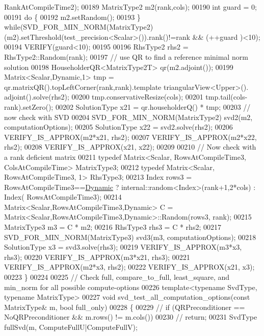 \begin{DoxyCode}
      RankAtCompileTime2);
00189   MatrixType2 m2(rank,cols);
00190   \textcolor{keywordtype}{int} guard = 0;
00191   \textcolor{keywordflow}{do} \{
00192     m2.setRandom();
00193   \} \textcolor{keywordflow}{while}(SVD\_FOR\_MIN\_NORM(MatrixType2)(m2).setThreshold(test\_precision<Scalar>()).rank()!=rank && (++guard
      )<10);
00194   VERIFY(guard<10);
00195 
00196   RhsType2 rhs2 = RhsType2::Random(rank);
00197   \textcolor{comment}{// use QR to find a reference minimal norm solution}
00198   HouseholderQR<MatrixType2T> qr(m2.adjoint());
00199   Matrix<Scalar,Dynamic,1> tmp = qr.matrixQR().topLeftCorner(rank,rank).template triangularView<Upper>().
      adjoint().solve(rhs2);
00200   tmp.conservativeResize(cols);
00201   tmp.tail(cols-rank).setZero();
00202   SolutionType x21 = qr.householderQ() * tmp;
00203   \textcolor{comment}{// now check with SVD}
00204   SVD\_FOR\_MIN\_NORM(MatrixType2) svd2(m2, computationOptions);
00205   SolutionType x22 = svd2.solve(rhs2);
00206   VERIFY\_IS\_APPROX(m2*x21, rhs2);
00207   VERIFY\_IS\_APPROX(m2*x22, rhs2);
00208   VERIFY\_IS\_APPROX(x21, x22);
00209 
00210   \textcolor{comment}{// Now check with a rank deficient matrix}
00211   \textcolor{keyword}{typedef} Matrix<Scalar, RowsAtCompileTime3, ColsAtCompileTime> MatrixType3;
00212   \textcolor{keyword}{typedef} Matrix<Scalar, RowsAtCompileTime3, 1> RhsType3;
00213   Index rows3 = RowsAtCompileTime3==\hyperlink{namespace_eigen_ad81fa7195215a0ce30017dfac309f0b2}{Dynamic} ? internal::random<Index>(rank+1,2*cols) : Index(
      RowsAtCompileTime3);
00214   Matrix<Scalar,RowsAtCompileTime3,Dynamic> C = Matrix<Scalar,RowsAtCompileTime3,Dynamic>::Random(rows3,
      rank);
00215   MatrixType3 m3 = C * m2;
00216   RhsType3 rhs3 = C * rhs2;
00217   SVD\_FOR\_MIN\_NORM(MatrixType3) svd3(m3, computationOptions);
00218   SolutionType x3 = svd3.solve(rhs3);
00219   VERIFY\_IS\_APPROX(m3*x3, rhs3);
00220   VERIFY\_IS\_APPROX(m3*x21, rhs3);
00221   VERIFY\_IS\_APPROX(m2*x3, rhs2);
00222   VERIFY\_IS\_APPROX(x21, x3);
00223 \}
00224 
00225 \textcolor{comment}{// Check full, compare\_to\_full, least\_square, and min\_norm for all possible compute-options}
00226 \textcolor{keyword}{template}<\textcolor{keyword}{typename} SvdType, \textcolor{keyword}{typename} MatrixType>
00227 \textcolor{keywordtype}{void} svd\_test\_all\_computation\_options(\textcolor{keyword}{const} MatrixType& m, \textcolor{keywordtype}{bool} full\_only)
00228 \{
00229 \textcolor{comment}{//   if (QRPreconditioner == NoQRPreconditioner && m.rows() != m.cols())}
00230 \textcolor{comment}{//     return;}
00231   SvdType fullSvd(m, ComputeFullU|ComputeFullV);

\end{DoxyCode}

